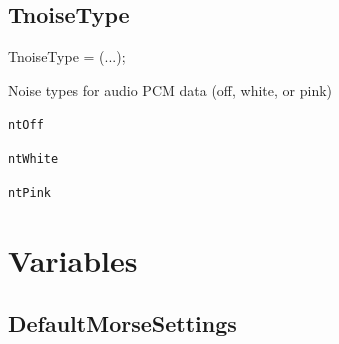 \documentclass{report}
\newif\ifpdf
\begin{document}
\subsection*{TnoiseType}
\fi
\label{morse.base-TnoiseType}
\begin{list}{}{
\setlength{\itemindent}{0cm}
\setlength{\listparindent}{0cm}
\setlength{\leftmargin}{\evensidemargin}
\addtolength{\leftmargin}{\tmplength}
\settowidth{\labelsep}{X}
\addtolength{\leftmargin}{\labelsep}
\setlength{\labelwidth}{\tmplength}
}
\item[\textbf{Declaration}\hfill]
\ifpdf
\begin{flushleft}
\fi
\begin{ttfamily}
TnoiseType = (...);\end{ttfamily}

\ifpdf
\end{flushleft}
\fi

\par
\item[\textbf{Description}]
Noise types for audio PCM data (off, white, or pink)\item[\textbf{Values}]
\begin{description}
\item[\texttt{ntOff}] \label{morse.base-ntOff}
\index{}
 
\item[\texttt{ntWhite}] \label{morse.base-ntWhite}
\index{}
 
\item[\texttt{ntPink}] \label{morse.base-ntPink}
\index{}
 
\end{description}


\end{list}
\section{Variables}
\ifpdf
\subsection*{\large{\textbf{DefaultMorseSettings}}\normalsize\hspace{1ex}\hrulefill}
\else
\end{document}
